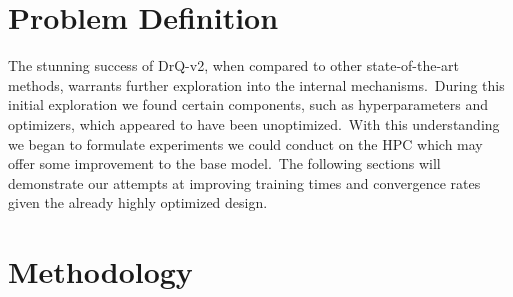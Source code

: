 \documentclass[conference]{./IEEEtran/IEEEtran} %
\begin{document}
    \section{Problem Definition}\label{sec:problem-definition}

    The stunning success of DrQ-v2, when compared to other state-of-the-art methods, warrants further exploration into the internal 
    mechanisms.\ During this initial exploration we found certain components, such as hyperparameters and optimizers, which appeared
    to have been unoptimized.\ With this understanding we began to formulate experiments we could conduct on the HPC which may offer
    some improvement to the base model.\ The following sections will demonstrate our attempts at improving training times and convergence
    rates given the already highly optimized design.

    \section{Methodology}\label{sec:methodology}

\end{document}
